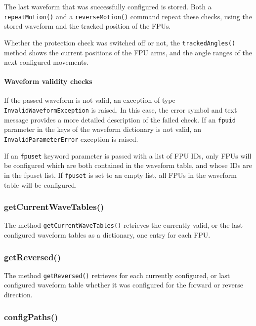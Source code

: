 \documentclass[11pt,a4paper]{scrartcl}
\begin{document}
The last waveform that was successfully configured is stored. Both a
\texttt{repeatMotion()} and a \texttt{reverseMotion()} command repeat
these checks, using the stored waveform and the tracked position of
the FPUs.


Whether the protection check was switched off or not, the
\texttt{trackedAngles()} method shows the current positions of the FPU
arms, and the angle ranges of the next configured movements.




\paragraph{Waveform validity checks}
\begin{sloppypar}
If the passed waveform is not valid, an exception of type
\texttt{InvalidWaveformException} is raised. In this case, the error
symbol and text message provides a more detailed description of the
failed check. If an \texttt{fpuid} parameter in the keys of the waveform dictionary
is not valid, an \texttt{InvalidParameterError} exception is raised.
\end{sloppypar}

If an \texttt{fpuset} keyword parameter is passed with a list of FPU
IDs, only FPUs will be configured which are both contained in the
waveform table, and whose IDs are in the fpuset list. If
\texttt{fpuset} is set to an empty list, all FPUs in the waveform
table will be configured.


\subsubsection{getCurrentWaveTables()}
 The method
\texttt{getCurrentWaveTables()} retrieves the currently valid, or the
last configured waveform tables as a dictionary, one entry for each
FPU.


\subsubsection{getReversed()}
 The method \texttt{getReversed()}
retrieves for each currently configured, or last configured waveform
table whether it was configured for the forward or reverse direction.


\subsubsection{configPaths()}
\label{sec:configpaths}
\end{document}
